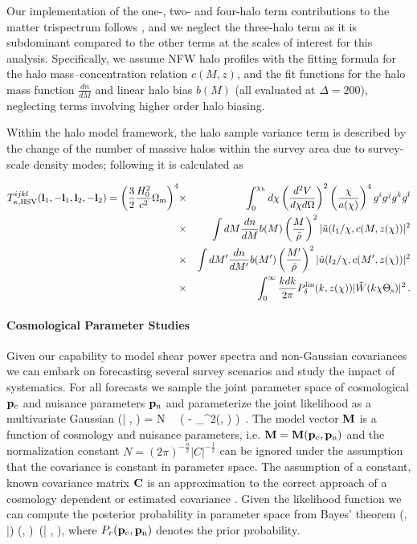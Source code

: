 Our implementation of the one-, two- and four-halo term contributions to the matter trispectrum follows \citet{CH01}, and we neglect the three-halo term as it is subdominant compared to the other terms at the scales of interest for this analysis. Specifically, we assume NFW halo profiles \citep{NFW} with the \citet{Bhattacharya11} fitting formula for the halo mass--concentration relation $c(M,z)$, and the \citet{Tinker2008} fit functions for the halo mass function $\frac{ dn}{dM}$ and linear halo bias $b(M)$ (all evaluated at $\Delta = 200$), neglecting terms involving higher order halo biasing.


Within the halo model framework, the halo sample variance term is described by the change of the number of massive halos within the survey area due to survey-scale density modes; following \citet{sht09} it is calculated as

\begin{eqnarray}
T_{\kappa,\rm{HSV}}^{ijkl}(\mathbf l_1,-\mathbf l_1,\mathbf l_2,-\mathbf l_2)= \left(\frac{3}{2}\frac{H_0^2}{c^2}\Omega_{\mathrm m}\right)^4 &\times&  \int_0^{\chi_\mathrm h}d\chi \left(\frac{d^2 V}{d\chi d\Omega}\right)^2 \left(\frac{\chi}{a(\chi)}\right)^4 g^i g^j g^k g^l \nonumber \\
&\times&  \int d M \frac{d n}{d M} b(M)\left(\frac{M}{\bar{\rho}}\right)^2 |\tilde{u}(l_1/\chi, c(M,z(\chi))|^2 \nonumber \\
 &\times& \int d M' \frac{d n}{d M'} b(M')\left(\frac{M'}{\bar{\rho}}\right)^2 |\tilde{u}(l_2/\chi, c(M',z(\chi))|^2 \nonumber \\
 &\times&  \int_0^\infty \frac{k dk}{2\pi}P_\delta^{\mathrm{lin}}(k,z(\chi))|\tilde W(k\chi \Theta_{\mathrm s})|^2 \,.
\end{eqnarray}


\paragraph{Cosmological Parameter Studies} Given our capability to model shear power spectra and non-Gaussian covariances we can embark on forecasting several survey scenarios and study the impact of systematics. For all forecasts we sample the joint parameter space of cosmological $\mathbf p_\mathrm{c}$ and nuisance parameters $\mathbf p_\mathrm{n}$ and parameterize the joint likelihood as a multivariate Gaussian
\be
\label{eq:like}
\like (\D| \pco, \pnu) = N \, \times \, \exp \biggl( - _{\chi^2(\pco, \pnu)}  \biggr) \,.
\ee
The model vector $\mathbf M$ is a function of cosmology and nuisance parameters, i.e. $\mathbf M=\mathbf M(\mathbf p_\mathrm{c}, \mathbf p_\mathrm{n})$ and the normalization constant $N=(2 \pi)^{-\frac{n}{2}} |C|^{-\frac{1}{2}}$ can be ignored under the assumption that the covariance is constant in parameter space. The assumption of a constant, known covariance matrix $\mathbf C$ is an approximation to the correct approach of a cosmology dependent or estimated covariance \citep[see][for further details]{esh09, seh16}.
Given the likelihood function we can compute the posterior probability in parameter space from Bayes' theorem
\be
\label{eq:bayes}
\prob(\pco, \pnu|\D) \propto \probr (\pco, \pnu) \,\like (\D| \pco, \pnu),
\ee
where $P_r (\mathbf p_\mathrm{c}, \mathbf p_\mathrm{n})$ denotes the prior probability.

